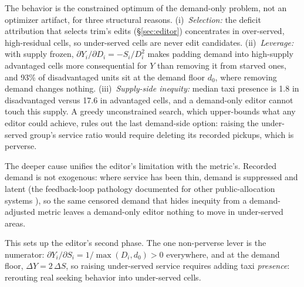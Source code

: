 The behavior is the constrained optimum of the demand-only problem, not an
optimizer artifact, for three structural reasons. (i)~\emph{Selection:} the
deficit attribution that selects trim's edits (\S\ref{sec:editor}) concentrates
in over-served, high-residual cells, so under-served cells are never edit
candidates. (ii)~\emph{Leverage:} with supply frozen,
$\partial Y_i / \partial D_i = -S_i / D_i^{2}$ makes padding demand into
high-supply advantaged cells more consequential for $Y$
than removing it from starved ones, and 93\% of disadvantaged units sit at
the demand floor $d_0$, where removing demand changes nothing.
(iii)~\emph{Supply-side inequity:} median taxi presence is 1.8 in disadvantaged
versus 17.6 in advantaged cells, and a demand-only editor cannot touch this supply.
A greedy unconstrained search, which upper-bounds what any editor could
achieve, rules out the last demand-side option: raising the under-served
group's service ratio would require deleting its recorded pickups, which is
perverse.

The deeper cause unifies the editor's limitation with the metric's. Recorded
demand is not exogenous: where service has been thin, demand is suppressed and
latent (the feedback-loop pathology documented for other public-allocation
systems \cite{ensign2018,lumisaac2016}), so the same censored demand that
hides inequity from a demand-adjusted metric leaves a demand-only editor
nothing to move in under-served areas.

This sets up the editor's second phase. The one non-perverse lever is the
numerator: $\partial Y_i / \partial S_i = 1 / \max(D_i, d_0) > 0$ everywhere,
and at the demand floor, $\Delta Y = 2\,\Delta S$, so raising under-served
service requires adding taxi \emph{presence}: rerouting real seeking
behavior into under-served cells.

